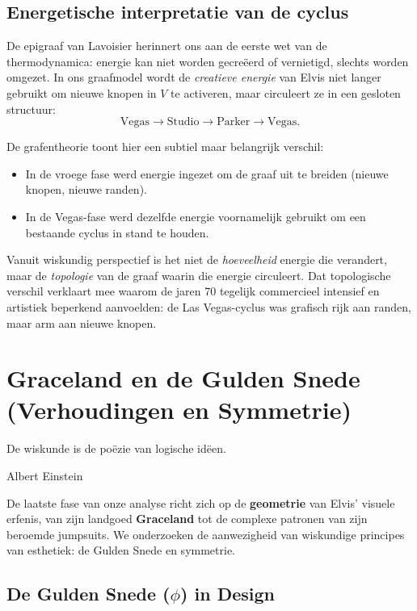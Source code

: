 \documentclass{book}
\begin{document}
	\section{Energetische interpretatie van de cyclus}
	
	De epigraaf van Lavoisier herinnert ons aan de eerste wet van de thermodynamica: energie kan niet worden gecre\"eerd of vernietigd, slechts worden omgezet. In ons graafmodel wordt de \emph{creatieve energie} van Elvis niet langer gebruikt om nieuwe knopen in $V$ te activeren, maar circuleert ze in een gesloten structuur:
	\[
	\text{Vegas} \to \text{Studio} \to \text{Parker} \to \text{Vegas}.
	\]
	
	De grafentheorie toont hier een subtiel maar belangrijk verschil:
	\begin{itemize}
		\item In de vroege fase werd energie ingezet om de graaf uit te breiden (nieuwe knopen, nieuwe randen).
		\item In de Vegas-fase werd dezelfde energie voornamelijk gebruikt om een bestaande cyclus in stand te houden.
	\end{itemize}
	
	Vanuit wiskundig perspectief is het niet de \emph{hoeveelheid} energie die verandert, maar de \emph{topologie} van de graaf waarin die energie circuleert. Dat topologische verschil verklaart mee waarom de jaren 70 tegelijk commercieel intensief en artistiek beperkend aanvoelden: de Las Vegas-cyclus was grafisch rijk aan randen, maar arm aan nieuwe knopen.
	
\chapter{Graceland en de Gulden Snede (Verhoudingen en Symmetrie)}
\label{chap:geometrie}

\epigraph{De wiskunde is de po\"ezie van logische id\"een.}{Albert Einstein}

De laatste fase van onze analyse richt zich op de \textbf{geometrie} van Elvis' visuele erfenis, van zijn landgoed \textbf{Graceland} tot de complexe patronen van zijn beroemde jumpsuits. We onderzoeken de aanwezigheid van wiskundige principes van esthetiek: de Gulden Snede en symmetrie.

\section{De Gulden Snede (\texorpdfstring{$\phi$}{phi}) in Design}
\end{document}

